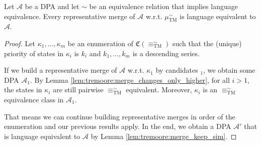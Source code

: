 \begin{theorem}
	Let $\mathcal{A}$ be a DPA and let $\sim$ be an equivalence relation that implies language equivalence. Every representative merge of $\mathcal{A}$ w.r.t. $\mu_\text{TM}^\sim$ is language equivalent to $\mathcal{A}$.
\end{theorem}

\begin{proof}
	Let $\kappa_1, \dots, \kappa_m$ be an enumeration of $\mathfrak{C}(\equiv^\sim_\text{TM})$ such that the (unique) priority of states in $\kappa_i$ is $k_i$ and $k_1, \dots, k_m$ is a descending series.
	
	If we build a representative merge of $\mathcal{A}$ w.r.t. $\kappa_1$ by candidates $_1$, we obtain some DPA $\mathcal{A}_1$. By Lemma \ref{lem:tremoore:merge_changes_only_higher}, for all $i > 1$, the states in $\kappa_i$ are still pairwise $\equiv^\sim_\text{TM}$ equivalent. Moreover, $\kappa_i$ is an $\equiv^\sim_\text{TM}$ equivalence class in $\mathcal{A}_1$.
	
	That means we can continue building representative merges in order of the enumeration and our previous results apply. In the end, we obtain a DPA $\mathcal{A}'$ that is language equivalent to $\mathcal{A}$ by Lemma \ref{lem:tremoore:merge_keep_sim}.
\end{proof}

\newpage






















